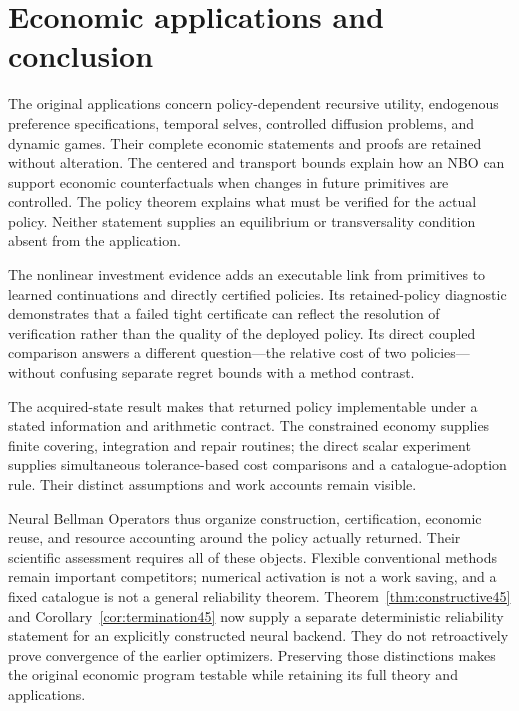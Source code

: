 \documentclass[ecta,nameyear,draft]{econsocart}
\begin{document}









\section{Economic applications and conclusion}\label{sec:conclusion}
The original applications concern policy-dependent recursive utility, endogenous preference specifications, temporal selves, controlled diffusion problems, and dynamic games. Their complete economic statements and proofs are retained without alteration. The centered and transport bounds explain how an NBO can support economic counterfactuals when changes in future primitives are controlled. The policy theorem explains what must be verified for the actual policy. Neither statement supplies an equilibrium or transversality condition absent from the application.

The nonlinear investment evidence adds an executable link from primitives to learned continuations and directly certified policies. Its retained-policy diagnostic demonstrates that a failed tight certificate can reflect the resolution of verification rather than the quality of the deployed policy. Its direct coupled comparison answers a different question---the relative cost of two policies---without confusing separate regret bounds with a method contrast.

The acquired-state result makes that returned policy implementable under a stated information and arithmetic contract. The constrained economy supplies finite covering, integration and repair routines; the direct scalar experiment supplies simultaneous tolerance-based cost comparisons and a catalogue-adoption rule. Their distinct assumptions and work accounts remain visible.

Neural Bellman Operators thus organize construction, certification, economic reuse, and resource accounting around the policy actually returned. Their scientific assessment requires all of these objects. Flexible conventional methods remain important competitors; numerical activation is not a work saving, and a fixed catalogue is not a general reliability theorem. Theorem~\ref{thm:constructive45} and Corollary~\ref{cor:termination45} now supply a separate deterministic reliability statement for an explicitly constructed neural backend. They do not retroactively prove convergence of the earlier optimizers. Preserving those distinctions makes the original economic program testable while retaining its full theory and applications.
\end{document}
